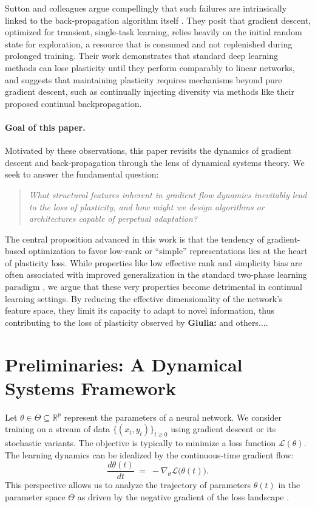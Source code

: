 \documentclass{article}
\newcommand{\Loss}{\mathcal{L}}
\newcommand{\R}{\mathbb{R}}
\newcommand{\giulia}[1]{{\color{ForestGreen}\textbf{Giulia:} #1}}
\begin{document}
Sutton and colleagues argue compellingly that such failures are intrinsically linked to the back-propagation algorithm itself \cite{dohare2024loss}. They posit that gradient descent, optimized for transient, single-task learning, relies heavily on the initial random state for exploration, a resource that is consumed and not replenished during prolonged training. Their work demonstrates that standard deep learning methods can lose plasticity until they perform comparably to linear networks, and suggests that maintaining plasticity requires mechanisms beyond pure gradient descent, such as continually injecting diversity via methods like their proposed continual backpropagation.

\paragraph{Goal of this paper.}
Motivated by these observations, this paper revisits the dynamics of gradient descent and back-propagation through the lens of dynamical systems theory. We seek to answer the fundamental question:
\begin{quote}
\emph{What structural features inherent in gradient flow dynamics inevitably lead to the loss of plasticity, and how might we design algorithms or architectures capable of perpetual adaptation?}
\end{quote}
The central proposition advanced in this work is that the tendency of gradient-based optimization to favor low-rank or ``simple'' representations lies at the heart of plasticity loss. While properties like low effective rank and simplicity bias are often associated with improved generalization in the standard two-phase learning paradigm \cite{huh2022lowrank, papyan2020prevalence, zhang2017understanding}, we argue that these very properties become detrimental in continual learning settings. By reducing the effective dimensionality of the network's feature space, they limit its capacity to adapt to novel information, thus contributing to the loss of plasticity observed by \cite{dohare2024loss} \giulia{and others...}.

\section{Preliminaries: A Dynamical Systems Framework}
\label{sec:framework}

Let $\theta\in\Theta\subseteq\R^p$ represent the parameters of a neural network. We consider training on a stream of data $\{(x_t,y_t)\}_{t\ge0}$ using gradient descent or its stochastic variants. The objective is typically to minimize a loss function $\Loss(\theta)$. The learning dynamics can be idealized by the continuous-time gradient flow:
\begin{equation}
    \frac{d\theta(t)}{dt} \;=\; -\nabla_\theta\Loss\bigl(\theta(t)\bigr).
    \label{eq:grad_flow}
\end{equation}
This perspective allows us to analyze the trajectory of parameters $\theta(t)$ in the parameter space $\Theta$ as driven by the negative gradient of the loss landscape \cite{saxe2014exact}.
\end{document}
